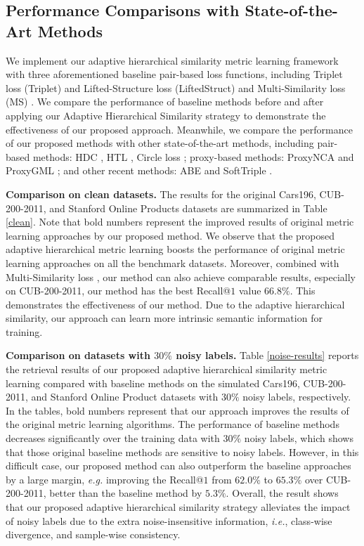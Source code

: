 \documentclass[lettersize,journal]{IEEEtran}
\begin{document}
\subsection{Performance Comparisons with State-of-the-Art Methods}
We implement our adaptive hierarchical similarity metric learning framework with three aforementioned baseline pair-based loss functions, including Triplet loss (Triplet) \cite{schroff2015facenet} and Lifted-Structure loss (LiftedStruct) \cite{oh2016deep} and Multi-Similarity loss (MS) \cite{wang2019multi}. We compare the performance of baseline methods before and after applying our Adaptive Hierarchical Similarity strategy to demonstrate the effectiveness of our proposed approach. Meanwhile, we compare the performance of our proposed methods with other state-of-the-art methods, including pair-based methods: HDC \cite{yuan2017hard}, HTL \cite{ge2018deep}, Circle loss \cite{sun2020circle}; proxy-based methods: ProxyNCA and ProxyGML \cite{zhu2020fewer}; and other recent methods: ABE \cite{kim2018attention} and SoftTriple \cite{qian2019softtriple}. %

\textbf{Comparison on clean datasets.} The results for the original  Cars196, CUB-200-2011,  and Stanford Online Products datasets are summarized in Table \ref{clean}.  Note that bold numbers represent the improved results of original metric learning approaches by our proposed method. We observe that the proposed adaptive hierarchical metric learning boosts the performance of original metric learning approaches on all the benchmark datasets. Moreover, combined with Multi-Similarity loss \cite{wang2019multi}, our method can also achieve comparable results, especially on CUB-200-2011, our method has the best Recall@$1$ value $66.8\%$. This demonstrates the effectiveness of our method. Due to the adaptive hierarchical similarity, our approach can learn more intrinsic semantic information for training. 

\textbf{Comparison on datasets with $30\%$ noisy labels.} Table \ref{noise-results} reports the retrieval results of our proposed adaptive hierarchical similarity metric learning compared with baseline methods on the simulated Cars196, CUB-200-2011,  and Stanford Online Product datasets with $30\%$ noisy labels, respectively. In the tables, bold numbers represent that our approach improves the results of the original metric learning algorithms.  The performance of baseline methods decreases significantly over the training data with $30\%$ noisy labels, which shows that those original baseline methods are sensitive to noisy labels. However, in this difficult case, our proposed method can also outperform the baseline approaches by a large margin, \textit{e.g.} improving the Recall@$1$ from $62.0\%$ to $65.3\%$ over CUB-200-2011, better than the baseline method by $5.3\%$. Overall, the result shows that our proposed adaptive hierarchical similarity strategy alleviates the impact of noisy labels due to the extra noise-insensitive information, \textit{i.e.}, class-wise divergence, and sample-wise consistency. 
\end{document}

